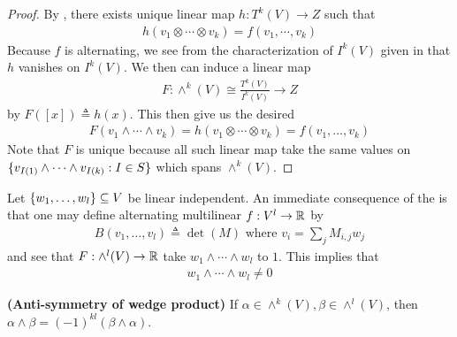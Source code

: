 \documentclass{report}
\begin{document}
\begin{proof}
By , there exists unique linear map $h:T^k(V)\rightarrow Z$ such that 
 \begin{align*}
h(v_1 \otimes  \cdots \otimes  v_k)=f(v_1,\cdots ,v_k)
\end{align*}
Because $f$ is alternating, we see from the characterization of $I^k(V)$ given in  that $h$ vanishes on $I^k(V)$. We then can induce a linear map 
\begin{align*}
F:\wedge^k (V)\cong \frac{T^k(V)}{I^k(V)} \rightarrow Z 
\end{align*}
by $F([x])\triangleq h(x)$. This then give us the desired  
\begin{align*}
F(v_1 \wedge  \cdots \wedge  v_k )=h(v_1\otimes  \cdots \otimes  v_k)=f(v_1,\dots ,v_k)
\end{align*}
Note that $F$ is unique because all such linear map take the same values on  $\{ v_{I(1)}\wedge  \cdots \wedge  v_{I(k)}:I \in S  \}$ which spans $\wedge ^k(V) $. 
\end{proof}
\begin{mdframed}
Let $\{ w_1,\dots ,w_l \}\subseteq V$ be linear independent. An immediate consequence of the  is that one may define alternating multilinear $f:V^l\rightarrow \mathbb{R}$ by 
\begin{align*}
B(v_1,\dots ,v_l)\triangleq \operatorname{det}(M)\text{ where }v_i= \sum_j M_{i,j}w_j
\end{align*}
and see that $F:\wedge^l (V)\rightarrow \mathbb{R} $ take $w_1\wedge  \cdots \wedge  w_l$ to $1$. This implies that  
\begin{align*}
w_1\wedge  \cdots \wedge  w_l \neq 0  
\end{align*}
\end{mdframed}
\begin{theorem}
\label{ASo}
\textbf{(Anti-symmetry of wedge product)} If $\alpha \in \wedge ^k (V),\beta \in \wedge ^l (V)  $, then $\alpha \wedge  \beta =(-1)^{kl}(\beta  \wedge  \alpha  )  $. 
\end{theorem}
\end{document}
